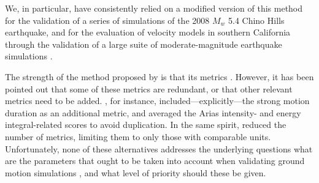 We, in particular, have consistently relied on a modified version of this method for the validation of a series of simulations of the 2008 $M_w$ 5.4 Chino Hills earthquake, and for the evaluation of velocity models in southern California through the validation of a large suite of moderate-magnitude earthquake simulations \citep{Taborda_2013_BSSA, Taborda_2014_BSSA, Taborda_2016_GJI}. 



The strength of the method proposed by \citet{Anderson_2004_Proc} is that its metrics . However, it has been pointed out that some of these metrics are redundant, or that other relevant metrics need to be added. \citet{Taborda_2013_BSSA}, for instance, included---explicitly---the strong motion duration \citep{Trifunac_1975_BSSA} as an additional metric, and averaged the Arias intensity- and energy integral-related scores to avoid duplication. In the same spirit, \citet{Maufroy_2015_BSSA} reduced the number of metrics, limiting them to only those with comparable units. Unfortunately, none of these alternatives addresses the underlying questions  what are the  parameters that ought to be taken into account when validating ground motion simulations , and what level of priority should these  be given.


